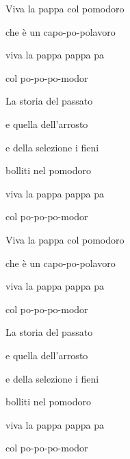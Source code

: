 \documentclass{article}
\begin{document}
Viva la pappa col pomodoro

che \`e un capo-po-polavoro

viva la pappa pappa pa

col po-po-po-modor

La storia del passato

e quella dell'arrosto

e della selezione i fieni

bolliti nel pomodoro

viva la pappa pappa pa

col po-po-po-modor

Viva la pappa col pomodoro

che \`e un capo-po-polavoro

viva la pappa pappa pa

col po-po-po-modor

La storia del passato

e quella dell'arrosto

e della selezione i fieni

bolliti nel pomodoro

viva la pappa pappa pa

col po-po-po-modor
\end{document}
